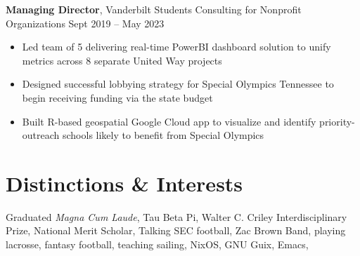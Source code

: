 \documentclass[10.5pt]{article}
\newcommand{\postlinebreakspacing} {
  \vspace{0.7ex}
}
\newcommand{\roleheader}[3]{
  \postlinebreakspacing
  \textbf{#1}, #2 \hfill #3
}
\newcommand{\itemizedrole}[5]{
  \roleheader{#1}{#2}{#3 -- #4}

  \begin{itemize}
    #5
  \end{itemize}
}
\begin{document}
\itemizedrole
{Managing Director}
{Vanderbilt Students Consulting for Nonprofit Organizations}
{Sept 2019}
{May 2023}
{
	\item Led team of 5 delivering real-time PowerBI dashboard solution to unify metrics across 8 separate United Way projects
	\item Designed successful lobbying strategy for Special Olympics Tennessee to begin receiving funding via the state budget
	\item Built R-based geospatial Google Cloud app to visualize and identify priority-outreach schools likely to benefit from Special Olympics
}


\section*{Distinctions \& Interests}
\postlinebreakspacing
\lines
{
	 {Graduated \textit{Magna Cum Laude}, Tau Beta Pi, Walter C. Criley Interdisciplinary Prize, National Merit Scholar},
	 {Talking SEC football, Zac Brown Band, playing lacrosse, fantasy football, teaching sailing, NixOS, GNU Guix, Emacs},
}
\end{document}
